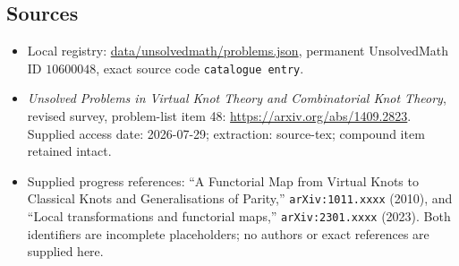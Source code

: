 \documentclass[11pt]{article}
\begin{document}
\subsection{Sources}
\begin{itemize}
\item Local registry: \url{data/unsolvedmath/problems.json}, permanent UnsolvedMath ID $10600048$, exact source code \texttt{catalogue entry}.
\item \emph{Unsolved Problems in Virtual Knot Theory and Combinatorial Knot Theory}, revised survey, problem-list item 48: \url{https://arxiv.org/abs/1409.2823}. Supplied access date: 2026-07-29; extraction: source-tex; compound item retained intact.
\item Supplied progress references: ``A Functorial Map from Virtual Knots to Classical Knots and Generalisations of Parity,'' \texttt{arXiv:1011.xxxx} (2010), and ``Local transformations and functorial maps,'' \texttt{arXiv:2301.xxxx} (2023). Both identifiers are incomplete placeholders; no authors or exact references are supplied here.
\end{itemize}
\end{document}
